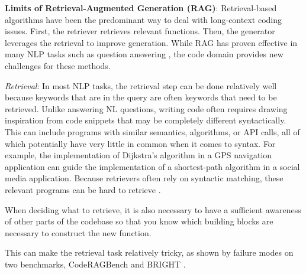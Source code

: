 
\textbf{Limits of Retrieval-Augmented Generation (RAG)}: Retrieval-based algorithms have been the predominant way to deal with long-context coding issues. First, the retriever retrieves relevant functions. Then, the generator leverages the retrieval to improve generation. While RAG has proven effective in many NLP tasks such as question answering \citep{gao2023retrieval, lewis2020retrieval}, the code domain provides new challenges for these methods.


\textit{Retrieval}: In most NLP tasks, the retrieval step can be done relatively well because keywords that are in the query are often keywords that need to be retrieved. Unlike answering NL questions, writing code often requires drawing inspiration from code snippets that may be completely different syntactically. This can include programs with similar semantics, algorithms, or API calls, all of which potentially have very little in common when it comes to syntax. For example, the implementation of Dijkstra's algorithm in a GPS navigation application can guide the implementation of a shortest-path algorithm in a social media application. Because retrievers often rely on syntactic matching, these relevant programs can be hard to retrieve \citep{ma2024unveiling, utpala2023language}.

When deciding what to retrieve, it is also necessary to have a sufficient awareness of other parts of the codebase so that you know which building blocks are necessary to construct the new function. 

This can make the retrieval task relatively tricky, as shown by failure modes on two benchmarks, CodeRAGBench \citep{wang2024coderag} and BRIGHT \citep{su2024bright}.


